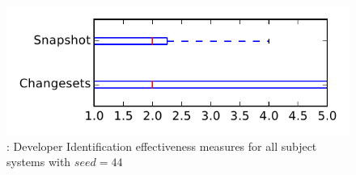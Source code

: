 
\begin{figure}
\centering
\includegraphics[height=0.4\textheight]{figures/dit_seed/rq1_tiny_44}
\caption{\rtwo: Developer Identification effectiveness measures for all subject systems with $seed=44$}
\label{fig:dit_seed:rq1:tiny}
\end{figure}
